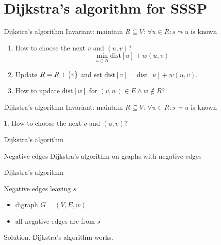 \section{Dijkstra's algorithm for SSSP}

\begin{frame}{Dijkstra's algorithm}
  Invariant: maintain $R \subseteq V$: $\forall u \in R: s \leadsto u$ is known
  \begin{enumerate}
    \item How to choose the next $v$ and $(u,v)$?
      \[ \min_{u \in R} \text{dist}[u] + w(u,v) \]
    \item Update $R = R + \{v\}$ and set $\text{dist}[v] = \text{dist}[u] + w(u,v)$.
    \item How to update $\text{dist}[w]$ for $(v,w) \in E \land w \notin R$?
  \end{enumerate}
\end{frame}
\begin{frame}{Dijkstra's algorithm}
  Invariant: maintain $R \subseteq V$: $\forall u \in R: s \leadsto u$ is known
  \begin{exampleblock}{1. How to choose the next $v$ and $(u,v)$?}
      
  \end{exampleblock}
\end{frame}
\begin{frame}{Dijkstra's algorithm}
  \begin{exampleblock}{Negative edges }
    Dijkstra's algorithm on graphs with negative edges
  \end{exampleblock}
\end{frame}
\begin{frame}{Dijkstra's algorithm}
  \begin{exampleblock}{Negative edges leaving $s$ }
    \begin{itemize}
      \item digraph $G = (V, E, w)$
      \item all negative edges are from $s$
    \end{itemize}
  \end{exampleblock}

  \begin{block}{Solution.}
    Dijkstra's algorithm works.
  \end{block}
\end{frame}
